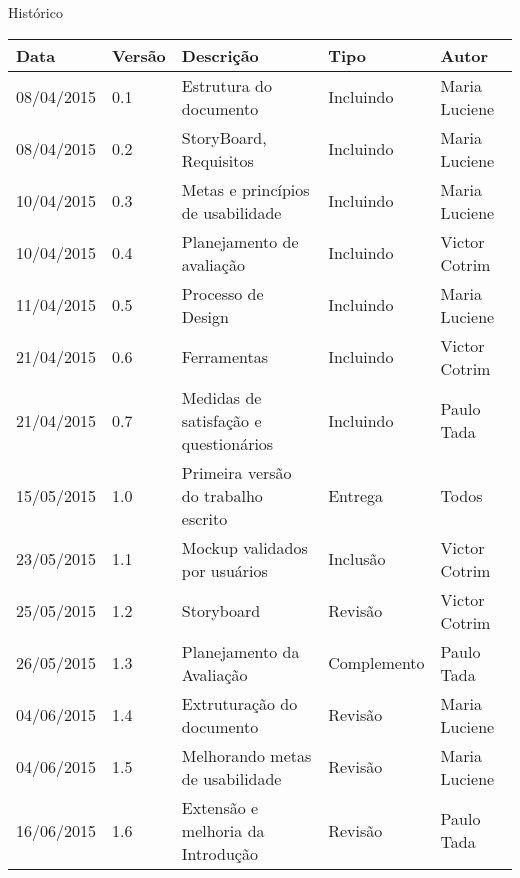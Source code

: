 \begin{center}
	{\fontsize{1cm}{1em}\selectfont Histórico}
\end{center}

\begin{table}[h]
	\centering
	\begin{tabular}{|l|l|l|l|l|}
		\hline
		Data & Versão & Descrição & Tipo & Autor \\ \hline
		08/04/2015 & 0.1 & Estrutura do documento & Incluindo & Maria Luciene \\ \hline
		08/04/2015 & 0.2 & StoryBoard, Requisitos & Incluindo & Maria Luciene \\ \hline
		10/04/2015 & 0.3 & Metas e princípios de usabilidade & Incluindo & Maria Luciene \\ \hline
		10/04/2015 & 0.4 & Planejamento de avaliação & Incluindo & Victor Cotrim \\ \hline
		11/04/2015 & 0.5 & Processo de Design & Incluindo & Maria Luciene \\ \hline	
		21/04/2015 & 0.6 & Ferramentas & Incluindo & Victor Cotrim \\ \hline
		21/04/2015 & 0.7 & Medidas de satisfação e questionários & Incluindo & Paulo Tada \\ \hline
		15/05/2015 & 1.0 & Primeira versão do trabalho escrito & Entrega & Todos \\ \hline
		23/05/2015 & 1.1 & Mockup validados por usuários & Inclusão & Victor Cotrim \\ \hline
		25/05/2015 & 1.2 & Storyboard & Revisão & Victor Cotrim \\ \hline
		26/05/2015 & 1.3 & Planejamento da Avaliação & Complemento & Paulo Tada \\ \hline
		04/06/2015 & 1.4 & Extruturação do documento & Revisão & Maria Luciene \\ \hline
		04/06/2015 & 1.5 & Melhorando metas de usabilidade & Revisão & Maria Luciene \\ \hline
		16/06/2015 & 1.6 & Extensão e melhoria da Introdução & Revisão & Paulo Tada \\ \hline
	\end{tabular}
\end{table}
\newpage